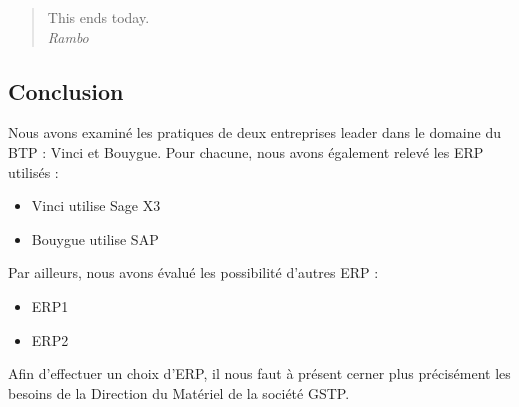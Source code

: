 \documentclass[a4paper]{article}
\begin{document}
\maketitle

\begin{quote}
This ends today.\\
\em Rambo
\end{quote}

\subsection{Conclusion}

Nous avons examiné les pratiques de deux entreprises leader dans le domaine
du BTP : Vinci et Bouygue. Pour chacune, nous avons également relevé les
ERP utilisés :

\begin{itemize}
\item Vinci utilise Sage X3
\item Bouygue utilise SAP
\end{itemize}

\vskip 6pt

Par ailleurs, nous avons évalué les possibilité d'autres ERP :
\begin{itemize}
\item ERP1
\item ERP2
\end{itemize}

\vskip 6pt

Afin d'effectuer un choix d'ERP, il nous faut à présent cerner plus
précisément les besoins de la Direction du Matériel de la société GSTP.
\end{document}
